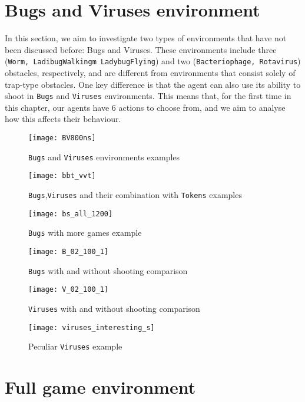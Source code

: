 \section{Bugs and Viruses environment}
In this section, we aim to investigate two types of environments that have not been discussed before: Bugs and Viruses. These environments include three (\texttt{Worm, LadibugWalkingm LadybugFlying}) and two (\texttt{Bacteriophage, Rotavirus}) obstacles, respectively, and are different from environments that consist solely of trap-type obstacles. One key difference is that the agent can also use its ability to shoot in \texttt{Bugs} and \texttt{Viruses} environments. This means that, for the first time in this chapter, our agents have 6 actions to choose from, and we aim to analyse how this affects their behaviour.

\begin{figure}[h]
    \centering
    \texttt{[image: BV800ns]}
    \caption{\texttt{Bugs} and \texttt{Viruses} environments examples}
    \label{fig:bv800ns_eg}
\end{figure}
\begin{figure}[h]
    \centering
    \texttt{[image: bbt\_vvt]}
    \caption{\texttt{Bugs},\texttt{Viruses} and their combination with \texttt{Tokens} examples}
    \label{fig:bbt_vvt_eg}
\end{figure}
\begin{figure}[h]
    \centering
    \texttt{[image: bs\_all\_1200]}
    \caption{\texttt{Bugs} with more games example}
    \label{fig:bs_all_120_eg}
\end{figure}
\begin{figure}[h]
    \centering
    \texttt{[image: B\_02\_100\_1]}
    \caption{\texttt{Bugs} with and without shooting comparison}
    \label{fig:B_02_100_1_eg}
\end{figure}
\begin{figure}[h]
    \centering
    \texttt{[image: V\_02\_100\_1]}
    \caption{\texttt{Viruses} with and without shooting comparison}
    \label{fig:V_02_100_1_eg}
\end{figure}
\begin{figure}[h]
    \centering
    \texttt{[image: viruses\_interesting\_s]}
    \caption{Peculiar \texttt{Viruses} example}
    \label{fig:viruses_interesting_s_eg}
\end{figure}

\section{Full game environment}